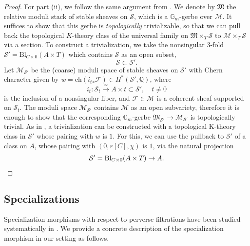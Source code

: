 \documentclass[11pt]{amsart}
\theoremstyle{plain}
\theoremstyle{definition}
\theoremstyle{remark}
\newcommand{\BQ}{{\mathbb{Q}}}
\newcommand{\CF}{{\mathcal F}}
\newcommand{\CM}{{\mathcal M}}
\newcommand{\CS}{{\mathcal S}}
\begin{document}
\begin{proof}
For part (ii), we follow the same argument from \cite[Section 3.1]{Markman5}. We denote by $\mathfrak{M}$ the relative moduli stack of stable sheaves on $\CS$, which is a $\mathbb{G}_m$-gerbe over $\CM$. It suffices to show that this gerbe is \emph{topologically} trivializable, so that we can pull back the topological $K$-theory class of the universal family on $\mathfrak{M}\times_T\CS$ to $\CM\times_T \CS$ via a section.  To construct a trivialization, we take the nonsingular 3-fold $\CS'= \mathrm{Bl}_{C\times 0}(A \times T)$ which contains $\CS$ as an open subset,
\[
\CS \subset \CS'.
\] 
Let $\CM_{\CS'}$ be the (coarse) moduli space of stable sheaves on $\CS'$ with Chern character given by $w =\mathrm{ch}({i_t}_\ast \CF) \in H^*(\CS', \BQ)$, where 
\[
i_t: \CS_t \xrightarrow{\simeq} A\times t \subset \CS', \quad t\neq 0
\]
is the inclusion of a nonsingular fiber, and $\CF \in \CM$ is a coherent sheaf supported on $\CS_t$. The moduli space $\CM_{\CS'}$ contains $\CM$ as an open subvariety, therefore it is enough to show that the corresponding $\mathbb{G}_m$-gerbe $\mathfrak{M}_{\CS'} \rightarrow \CM_{\CS'}$ is topologically trivial. As in \cite[Section 3.1]{Markman5}, a trivialization can be constructed with a topological K-theory class in $\CS'$ whose pairing with $w$ is $1$. For this, we can use the pullback to $\CS'$ of a class on $A$, whose pairing with $(0 ,r[C], \chi)$ is $1$, via the natural projection
\[
\CS' = \mathrm{Bl}_{C\times 0}(A\times T) \to A. \qedhere
\]
\end{proof}




\subsection{Specializations}\label{section4.3} Specialization morphisms with respect to perverse filtrations have been studied systematically in \cite{dCM, sp}. We provide a concrete description of the specialization morphism in our setting as follows.
\end{document}

